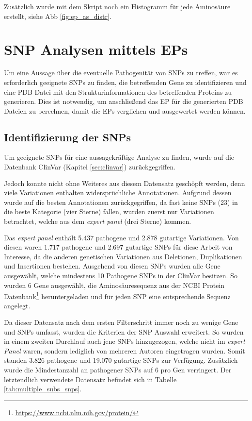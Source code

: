 Zusätzlich wurde mit dem Skript noch ein Histogramm für jede Aminosäure erstellt, siehe \ac{Abb} \ref{fig:ep_as_distr}.



\section{SNP Analysen mittels EPs}
\label{sec:snp_analyse}

Um eine Aussage über die eventuelle Pathogenität von \ac{SNP}s zu treffen, war es erforderlich geeignete \ac{SNP}s zu finden, die betreffenden Gene zu identifizieren und eine \ac{PDB} Datei mit den Strukturinformationen des betreffenden Proteins zu generieren. Dies ist notwendig, um anschließend das \ac{EP} für die generierten \ac{PDB} Dateien zu berechnen, damit die \ac{EP}s verglichen und ausgewertet werden können.


\subsection{Identifizierung der SNPs}
\label{sec:clinvar_filter}
Um geeignete \ac{SNP}s für eine aussagekräftige Analyse zu finden, wurde auf die Datenbank ClinVar (Kapitel \ref{sec:clinvar}) zurückgegriffen.

Jedoch konnte nicht ohne Weiteres aus diesem Datensatz geschöpft werden, denn viele Variationen enthalten widersprüchliche Annotationen. Aufgrund dessen wurde auf die besten Annotationen zurückgegriffen, da fast keine \ac{SNP}s (23) in die beste Kategorie (vier Sterne) fallen, wurden zuerst nur Variationen betrachtet, welche aus dem \emph{expert panel} (drei Sterne) kommen. 

Das \emph{expert panel} enthält 5.437 pathogene und 2.878 gutartige Variationen. Von diesen waren 1.717 pathogene und 2.697 gutartige \ac{SNP}s für diese Arbeit von Interesse, da die anderen genetischen Variationen aus Deletionen, Duplikationen und Insertionen bestehen. Ausgehend von diesen \ac{SNP}s wurden alle Gene ausgewählt, welche mindestens 10 Pathogene \ac{SNP}s in der ClinVar besitzen. So wurden 6 Gene ausgewählt, die Aminosäuresequenz aus der NCBI Protein Datenbank\footnote{\url{https://www.ncbi.nlm.nih.gov/protein/}} heruntergeladen und für jeden \ac{SNP} eine entsprechende Sequenz angelegt. 

Da dieser Datensatz nach dem ersten Filterschritt immer noch zu wenige Gene und \ac{SNP}s umfasst, wurden die Kriterien der \ac{SNP} Auswahl erweitert. So wurden in einem zweiten Durchlauf auch jene \ac{SNP}s hinzugezogen, welche nicht im \emph{expert Panel} waren, sondern lediglich von mehreren Autoren eingetragen wurden. Somit standen 3.826 pathogene und 19.070 gutartige \ac{SNP}s zur Verfügung. Zusätzlich wurde die Mindestanzahl an pathogener SNPs auf 6 pro Gen verringert. Der letztendlich verwendete Datensatz befindet sich in Tabelle \ref{tab:multiple_subs_snps}.


